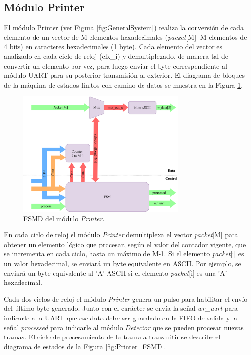 \subsection{Módulo Printer}
	\label{sec:printer}
	
	El módulo Printer (ver Figura \ref{fig:GeneralSystem}) realiza la conversión de cada elemento de un vector de M elementos hexadecimales (\textit{packet}[M], M elementos de 4 bits) en caracteres hexadecimales (1 byte). Cada elemento del vector es analizado en cada ciclo de reloj (clk\_i) y demultiplexado, de manera tal de convertir un elemento por vez, para luego enviar el byte correspondiente al módulo UART para su posterior transmisión al exterior. El diagrama de bloques de la máquina de estados finitos con camino de datos se muestra en la Figura \ref{fig:Printer_module}.
	
	\begin{figure}[H]
		\centering
		\includegraphics[width=0.75\textwidth]{Figuras/Printer_module.png}
		\centering\caption{FSMD del módulo \textit{Printer}.}
		\label{fig:Printer_module}
	\end{figure}
	
	En cada ciclo de reloj el módulo \textit{Printer} demultiplexa el vector \textit{packet}[M] para obtener un elemento lógico que procesar, según el valor del contador vigente, que se incrementa en cada ciclo, hasta un máximo de M-1. Si el elemento \textit{packet}[i] es un valor hexadecimal, se enviará un byte equivalente en ASCII. Por ejemplo, se enviará un byte equivalente al 'A' ASCII si el elemento \textit{packet}[i] es una 'A' hexadecimal.
	
	Cada dos ciclos de reloj el módulo \textit{Printer} genera un pulso para habilitar el envío del último byte generado. Junto con el carácter se envía la señal \textit{wr\_uart} para indicarle a la UART que ese dato debe ser guardado en la FIFO de salida y la señal \textit{processed} para indicarle al módulo \textit{Detector} que se pueden procesar nuevas tramas. El ciclo de procesamiento de la trama a transmitir se describe el diagrama de estados de la Figura \ref{fig:Printer_FSMD}.
	
